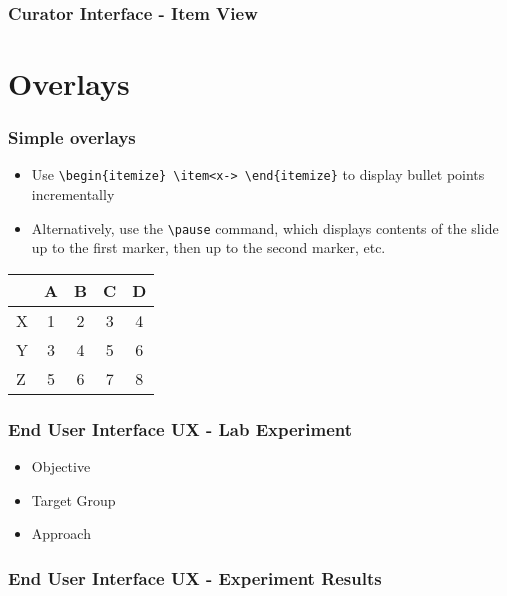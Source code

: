 \documentclass[xcolor=dvitex,t,11pt]{beamer}
\begin{document}
\begin{frame}[fragile]
\frametitle{Curator Interface - Item View}
\begin{figure}
\centering
{}
\end{figure}
\end{frame}


\section{Overlays}


\begin{frame}[fragile]
\frametitle{Simple overlays}
\begin{itemize}
\item<1-> Use \verb!\begin{itemize} \item<x-> \end{itemize}! to display bullet points incrementally
\item<2-> Alternatively, use the \verb!\pause! command, which displays contents of the slide up to the first marker, then up to the second marker, etc.
\end{itemize}
\pause
\begin{table}
\begin{tabular}{lcccc}
        & A & B & C & D \\\hline
  X     & 1 & 2 & 3 & 4 \pause\\
  Y     & 3 & 4 & 5 & 6 \pause\\
  Z     & 5 & 6 & 7 & 8
\end{tabular}
\end{table}
\end{frame}

\begin{frame}[fragile]
\frametitle{End User Interface UX - Lab Experiment}
\begin{itemize}
\item Objective
\item Target Group
\item Approach
\end{itemize}
\end{frame}


\begin{frame}[fragile]
\frametitle{End User Interface UX - Experiment Results}
\centering

\end{frame}
\end{document}
